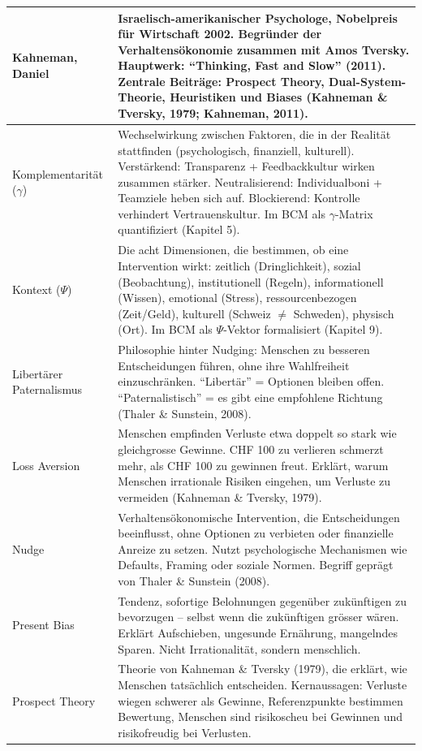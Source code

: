 \documentclass[11pt,a4paper]{article}
\begin{document}
\begin{longtable}{@{}L{4cm}L{10cm}@{}}
\midrule
Kahneman, Daniel & Israelisch-amerikanischer Psychologe, Nobelpreis für Wirtschaft 2002. Begründer der Verhaltensökonomie zusammen mit Amos Tversky. Hauptwerk: ``Thinking, Fast and Slow'' (2011). Zentrale Beiträge: Prospect Theory, Dual-System-Theorie, Heuristiken und Biases (Kahneman \& Tversky, 1979; Kahneman, 2011). \\
\midrule
Komplementarität ($\gamma$) & Wechselwirkung zwischen Faktoren, die in der Realität stattfinden (psychologisch, finanziell, kulturell). Verstärkend: Transparenz + Feedbackkultur wirken zusammen stärker. Neutralisierend: Individualboni + Teamziele heben sich auf. Blockierend: Kontrolle verhindert Vertrauenskultur. Im BCM als $\gamma$-Matrix quantifiziert (Kapitel 5). \\
\midrule
Kontext ($\Psi$) & Die acht Dimensionen, die bestimmen, ob eine Intervention wirkt: zeitlich (Dringlichkeit), sozial (Beobachtung), institutionell (Regeln), informationell (Wissen), emotional (Stress), ressourcenbezogen (Zeit/Geld), kulturell (Schweiz $\neq$ Schweden), physisch (Ort). Im BCM als $\Psi$-Vektor formalisiert (Kapitel 9). \\
\midrule
Libertärer Paternalismus & Philosophie hinter Nudging: Menschen zu besseren Entscheidungen führen, ohne ihre Wahlfreiheit einzuschränken. ``Libertär'' = Optionen bleiben offen. ``Paternalistisch'' = es gibt eine empfohlene Richtung (Thaler \& Sunstein, 2008). \\
\midrule
Loss Aversion & Menschen empfinden Verluste etwa doppelt so stark wie gleichgrosse Gewinne. CHF 100 zu verlieren schmerzt mehr, als CHF 100 zu gewinnen freut. Erklärt, warum Menschen irrationale Risiken eingehen, um Verluste zu vermeiden (Kahneman \& Tversky, 1979). \\
\midrule
Nudge & Verhaltensökonomische Intervention, die Entscheidungen beeinflusst, ohne Optionen zu verbieten oder finanzielle Anreize zu setzen. Nutzt psychologische Mechanismen wie Defaults, Framing oder soziale Normen. Begriff geprägt von Thaler \& Sunstein (2008). \\
\midrule
Present Bias & Tendenz, sofortige Belohnungen gegenüber zukünftigen zu bevorzugen -- selbst wenn die zukünftigen grösser wären. Erklärt Aufschieben, ungesunde Ernährung, mangelndes Sparen. Nicht Irrationalität, sondern menschlich. \\
\midrule
Prospect Theory & Theorie von Kahneman \& Tversky (1979), die erklärt, wie Menschen tatsächlich entscheiden. Kernaussagen: Verluste wiegen schwerer als Gewinne, Referenzpunkte bestimmen Bewertung, Menschen sind risikoscheu bei Gewinnen und risikofreudig bei Verlusten. \\

\end{longtable}
\end{document}

